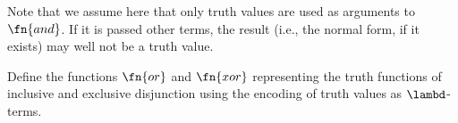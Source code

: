 \documentclass[../../../include/open-logic-section]{subfiles}
\begin{document}
Note that we assume here that only truth values are used as arguments
to $\fn{and}$. If it is passed other terms, the result (i.e., the
normal form, if it exists) may well not be a truth value.

\begin{prob}
  Define the functions $\fn{or}$ and $\fn{xor}$ representing the truth
  functions of inclusive and exclusive disjunction using the encoding
  of truth values as $\lambd$-terms.
\end{prob}
\end{document}
